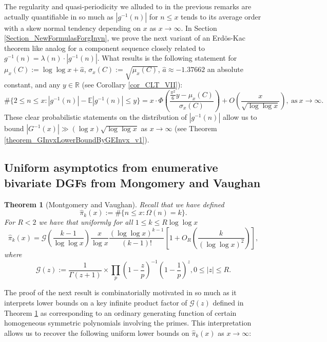 \documentclass[11pt,reqno,a4letter]{article}
\numberwithin{figure}{section}
\numberwithin{table}{section}
\theoremstyle{plain}
\newtheorem{theorem}{Theorem}
\numberwithin{theorem}{section}
\theoremstyle{definition}
\begin{document}
The regularity and quasi-periodicity we alluded to in the previous remarks are actually 
quantifiable in so much as $|g^{-1}(n)|$ for $n \leq x$ 
tends to its average order with a skew normal tendency 
depending on $x$ as $x \rightarrow \infty$. 
In Section \ref{Section_NewFormulasForgInvn}, 
we prove the next variant of an Erd\"os-Kac theorem like analog
for a component sequence closely related to $g^{-1}(n) = \lambda(n) \cdot |g^{-1}(n)|$. 
What results is the following statement for 
$\mu_x(C) := \log\log x + \hat{a}$, $\sigma_x(C) := \sqrt{\mu_x(C)}$, 
$\hat{a} \approx -1.37662$ an absolute constant, and any $y \in \mathbb{R}$ (see 
Corollary \ref{cor_CLT_VII}): 
\[
\#\{2 \leq n \leq x: |g^{-1}(n)| - \mathbb{E}|g^{-1}(n)| \leq y\} = 
     x \cdot \Phi\left(\frac{\frac{\pi^2}{6}y - \mu_x(C)}{\sigma_x(C)}\right) + 
     O\left(\frac{x}{\sqrt{\log\log x}}\right), 
     \mathrm{\ as\ } x \rightarrow \infty. 
\]
These clear probabilistic statements on the distribution of $|g^{-1}(n)|$ allow us 
to bound $|G^{-1}(x)| \gg (\log x) \sqrt{\log\log x}$ as $x \rightarrow \infty$ 
(see Theorem \ref{theorem_GInvxLowerBoundByGEInvx_v1}). 

\subsection{Uniform asymptotics from enumerative bivariate DGFs from Mongomery and Vaughan} 

\begin{theorem}[Montgomery and Vaughan]
\label{theorem_HatPi_ExtInTermsOfGz} 
Recall that we have defined 
$$\widehat{\pi}_k(x) := \#\{n \leq x: \Omega(n)=k\}.$$ 
For $R < 2$ we have that uniformly for all $1 \leq k \leq R \log\log x$ 
\[
\widehat{\pi}_k(x) = \mathcal{G}\left(\frac{k-1}{\log\log x}\right) \frac{x}{\log x} 
     \frac{(\log\log x)^{k-1}}{(k-1)!} \left[1 + O_R\left(\frac{k}{(\log\log x)^2}\right)\right], 
\]
where 
\[
\mathcal{G}(z) := \frac{1}{\Gamma(z+1)} \times 
     \prod_p \left(1-\frac{z}{p}\right)^{-1} \left(1-\frac{1}{p}\right)^z, 0 \leq |z| \leq R. 
\]
\end{theorem} 

The proof of the next result is combinatorially motivated in so much as it interprets 
lower bounds on a key infinite product factor of $\mathcal{G}(z)$ defined in 
Theorem \ref{theorem_HatPi_ExtInTermsOfGz} 
as corresponding to an ordinary generating function of certain 
homogeneous symmetric polynomials involving the primes. This interpretation allows us to recover the 
following uniform lower bounds on $\widehat{\pi}_k(x)$ as $x \rightarrow \infty$: 
\end{document}
